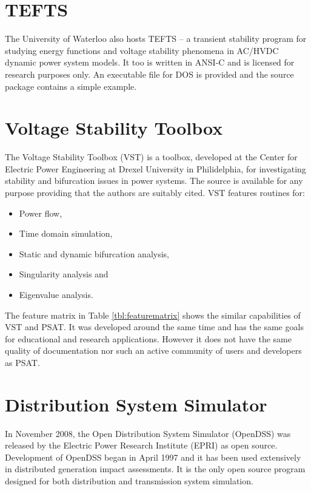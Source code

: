 \section{TEFTS}
The University of Waterloo also hosts TEFTS -- a transient stability program
for studying energy functions and voltage stability phenomena in AC/HVDC
dynamic power system models.  It too is written in ANSI-C and is licensed for
research purposes only.  An executable file for DOS is provided and the source
package contains a simple example.

\section*{Voltage Stability Toolbox}
The Voltage Stability Toolbox (VST) is a \matlab toolbox, developed at the
Center for Electric Power Engineering at Drexel University in Philidelphia, for
investigating stability and bifurcation issues in power systems.  The source
is available for any purpose providing that the authors are suitably cited.
VST features routines for:
\begin{itemize}
  \item Power flow,
  \item Time domain simulation,
  \item Static and dynamic bifurcation analysis,
  \item Singularity analysis and
  \item Eigenvalue analysis.
\end{itemize}
The feature matrix in Table \ref{tbl:featurematrix} shows the similar
capabilities of VST and PSAT. It was developed around the same time and has
the same goals for educational and research applications.  However it does not
have the same quality of documentation nor such an active community of users
and developers as PSAT.

\section{Distribution System Simulator}
In November 2008, the Open Distribution System Simulator (OpenDSS) was released
by the Electric Power Research Institute (EPRI) as open source.  Development of
OpenDSS began in April 1997 and it has been used extensively in distributed
generation impact assessments.  It is the only open source
program designed for both distribution and transmission system simulation.

